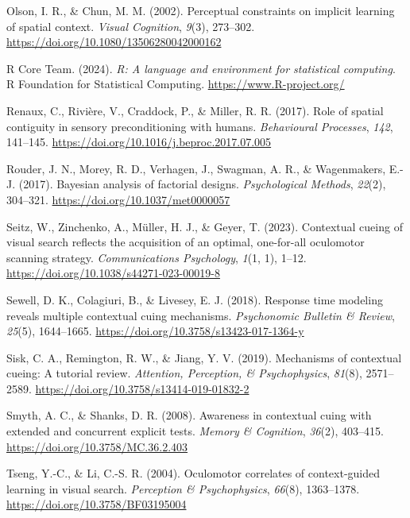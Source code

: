 \documentclass[
  man,
  floatsintext,
  longtable,
  nolmodern,
  notxfonts,
  notimes,
  colorlinks=true,linkcolor=blue,citecolor=blue,urlcolor=blue]{apa7}
\newlength{\cslhangindent}
\newenvironment{CSLReferences}[2] %
 {\begin{list}{}{%
  \setlength{\itemindent}{0pt}
  \setlength{\leftmargin}{0pt}
  \setlength{\parsep}{0pt}
  \ifodd #1
   \setlength{\leftmargin}{\cslhangindent}
   \setlength{\itemindent}{-1\cslhangindent}
  \fi
  \setlength{\itemsep}{#2\baselineskip}}}
 {\end{list}}
\begin{document}
\begin{CSLReferences}{1}{0}
Olson, I. R., \& Chun, M. M. (2002). Perceptual constraints on implicit
learning of spatial context. \emph{Visual Cognition}, \emph{9}(3),
273--302. \url{https://doi.org/10.1080/13506280042000162}

R Core Team. (2024). \emph{R: A language and environment for statistical
computing}. R Foundation for Statistical Computing.
\url{https://www.R-project.org/}

Renaux, C., Rivière, V., Craddock, P., \& Miller, R. R. (2017). Role of
spatial contiguity in sensory preconditioning with humans.
\emph{Behavioural Processes}, \emph{142}, 141--145.
\url{https://doi.org/10.1016/j.beproc.2017.07.005}

Rouder, J. N., Morey, R. D., Verhagen, J., Swagman, A. R., \&
Wagenmakers, E.-J. (2017). Bayesian analysis of factorial designs.
\emph{Psychological Methods}, \emph{22}(2), 304--321.
\url{https://doi.org/10.1037/met0000057}

Seitz, W., Zinchenko, A., Müller, H. J., \& Geyer, T. (2023). Contextual
cueing of visual search reflects the acquisition of an optimal,
one-for-all oculomotor scanning strategy. \emph{Communications
Psychology}, \emph{1}(1, 1), 1--12.
\url{https://doi.org/10.1038/s44271-023-00019-8}

Sewell, D. K., Colagiuri, B., \& Livesey, E. J. (2018). Response time
modeling reveals multiple contextual cuing mechanisms. \emph{Psychonomic
Bulletin \& Review}, \emph{25}(5), 1644--1665.
\url{https://doi.org/10.3758/s13423-017-1364-y}

Sisk, C. A., Remington, R. W., \& Jiang, Y. V. (2019). Mechanisms of
contextual cueing: {A} tutorial review. \emph{Attention, Perception, \&
Psychophysics}, \emph{81}(8), 2571--2589.
\url{https://doi.org/10.3758/s13414-019-01832-2}

Smyth, A. C., \& Shanks, D. R. (2008). Awareness in contextual cuing
with extended and concurrent explicit tests. \emph{Memory \& Cognition},
\emph{36}(2), 403--415. \url{https://doi.org/10.3758/MC.36.2.403}

Tseng, Y.-C., \& Li, C.-S. R. (2004). Oculomotor correlates of
context-guided learning in visual search. \emph{Perception \&
Psychophysics}, \emph{66}(8), 1363--1378.
\url{https://doi.org/10.3758/BF03195004}


\end{CSLReferences}
\end{document}
